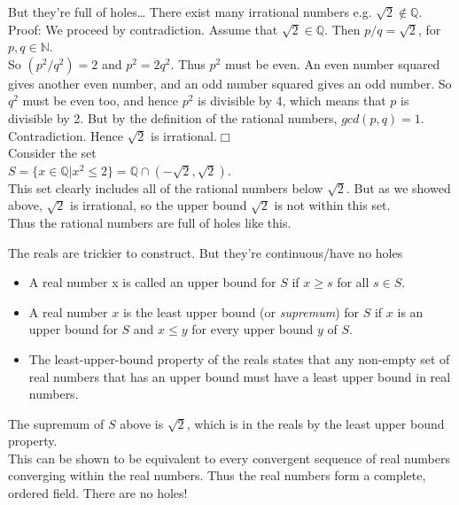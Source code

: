 \documentclass{beamer}
\begin{document}
\begin{frame}{But they're full of holes\ldots}
There exist many irrational numbers e.g. $\sqrt{2} \notin \mathbb{Q}$. \\
Proof:
We proceed by contradiction. Assume that $\sqrt{2} \in \mathbb{Q}$. Then $p / q = \sqrt{2}$, for $p, q \in \mathbb{N}$. \\
So $(p^2 / q^2) = 2$ and $p^2 = 2 q^2$. Thus $p^2$ must be even. An even number squared gives
another even number, and an odd number squared gives an odd number. So $q^2$ must be even too, and
hence $p^2$ is divisible by 4, which means that $p$ is divisible by 2. But by the definition of the 
rational numbers, $gcd(p, q) = 1$. Contradiction. Hence $\sqrt{2}$ is irrational.$\Box$\\
Consider the set\\
$S = \{ x \in \mathbb{Q} | x^2 \leq 2 \} = \mathbb{Q} \cap (-\sqrt{2}, \sqrt{2})$.\\
This set clearly includes all of the rational numbers below $\sqrt{2}$. But as we showed above, $\sqrt{2}$
is irrational, so the upper bound $\sqrt{2}$ is not within this set.\\
Thus the rational numbers are full of holes like this.
\end{frame}

\begin{frame}{The reals are trickier to construct. But they're continuous/have no holes}
\begin{itemize}
\item A real number x is called an upper bound for $S$ if $x \geq s$ for all $s \in S$. \\
\item A real number $x$ is the least upper bound (or \emph{supremum}) for $S$ if $x$ is an upper bound for $S$ and $x \leq y$ for every upper bound $y$ of $S$.\\
\item The least-upper-bound property of the reals states that any non-empty set of real numbers that has an upper bound must have a least upper bound in real numbers.
\end{itemize}
The supremum of $S$ above is $\sqrt{2}$, which is in the reals by the least upper bound property.\\
This can be shown to be equivalent to every convergent sequence of real numbers converging within the
real numbers. Thus the real numbers form a complete, ordered field. There are no holes!
\end{frame}
\end{document}
